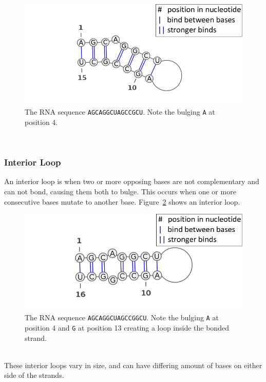 \begin{figure}[H]
\centering
\includegraphics[scale=0.4]{./lib/bulge.png}
\caption{The RNA sequence {\tt AGCAGGCUAGCCGCU}. Note the bulging {\tt A} at position 4.}
\label{fig:bulge}
\end{figure}~
\\
\subsubsection{Interior Loop}
An interior loop is when two or more opposing bases are not complementary and 
can not bond, causing them both to bulge. This occurs when one or more 
consecutive bases mutate to another base. Figure~\ref{fig:int-loop} shows an interior 
loop.
\begin{figure}[h!]
\centering
\includegraphics[scale=0.4]{./lib/interior-loop.png}
\caption{The RNA sequence {\tt AGCAGGCUAGCCGGCU}. Note the bulging {\tt A} at position 4 and {\tt G} at position 13
creating a loop inside the bonded strand.}
\label{fig:int-loop}
\end{figure}\\
These interior loops vary in size, and can have differing amount of bases on 
either side of the strands.

